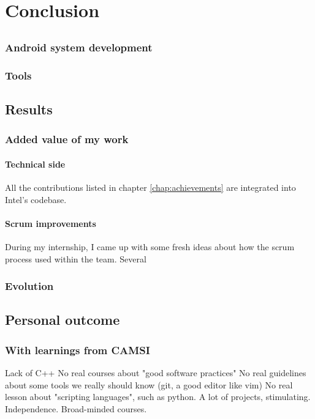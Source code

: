 \chapter{Conclusion}

\section{}
\subsection{Android system development}
\subsection{Tools}

\section{Results}

\subsection{Added value of my work}
\subsubsection{Technical side}
All the contributions listed in chapter \ref{chap:achievements} are integrated into Intel's codebase.
\subsubsection{Scrum improvements}
During my internship, I came up with some fresh ideas about how the \gls{scrum} process used within the team.
Several

\subsection{Evolution}


\section{Personal outcome}

\subsection{With learnings from CAMSI}
Lack of C++
No real courses about "good software practices"
No real guidelines about some tools we really should know (\gls{git}, a good editor like \gls{vim})
No real lesson about "scripting languages", such as python.
A lot of projects, stimulating. Independence. Broad-minded courses.

